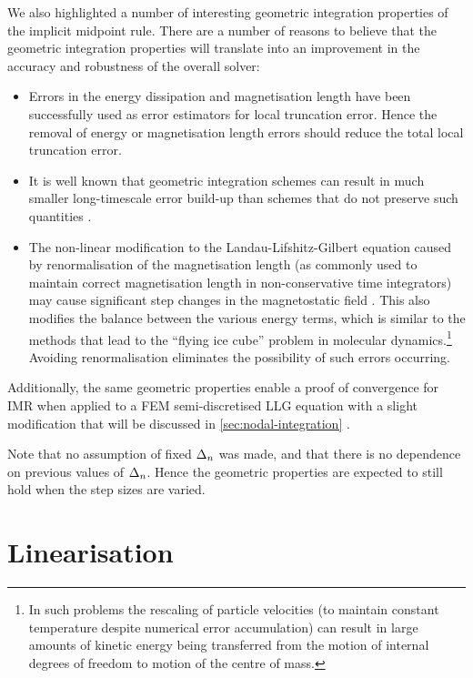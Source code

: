 We also highlighted a number of interesting geometric integration properties of the implicit midpoint rule.
There are a number of reasons to believe that the geometric integration properties will translate into an improvement in the accuracy and robustness of the overall solver:
\begin{itemize}
\item Errors in the energy dissipation \cite{Albuquerque2001} and magnetisation length \cite{Chantrell2001} have been successfully used as error estimators for local truncation error.
Hence the removal of energy or magnetisation length errors should reduce the total local truncation error.
\item It is well known that geometric integration schemes can result in much smaller long-timescale error build-up than schemes that do not preserve such quantities \cite[77]{Iserles2009}.
\item The non-linear modification to the Landau-Lifshitz-Gilbert equation caused by renormalisation of the magnetisation length (as commonly used to maintain correct magnetisation length in non-conservative time integrators) may cause significant step changes in the magnetostatic field \cite{Lewis2003}.
This also modifies the balance between the various energy terms, which is similar to the methods that lead to the ``flying ice cube'' problem \cite{Harvey1998} in molecular dynamics.\footnote{In such problems the rescaling of particle velocities (to maintain constant temperature despite numerical error accumulation) can result in large amounts of kinetic energy being transferred from the motion of internal degrees of freedom to motion of the centre of mass.}
Avoiding renormalisation eliminates the possibility of such errors occurring.
\end{itemize}

Additionally, the same geometric properties enable a proof of convergence for IMR when applied to a FEM semi-discretised LLG equation with a slight modification that will be discussed in \cref{sec:nodal-integration} \cite{Bartels2006}.

Note that no assumption of fixed $\Delta_{n}$ was made, and that there is no dependence on previous values of $\Delta_{n}$.
Hence the geometric properties are expected to still hold when the step sizes are varied.


\section{Linearisation}
\label{sec:linearisation}

